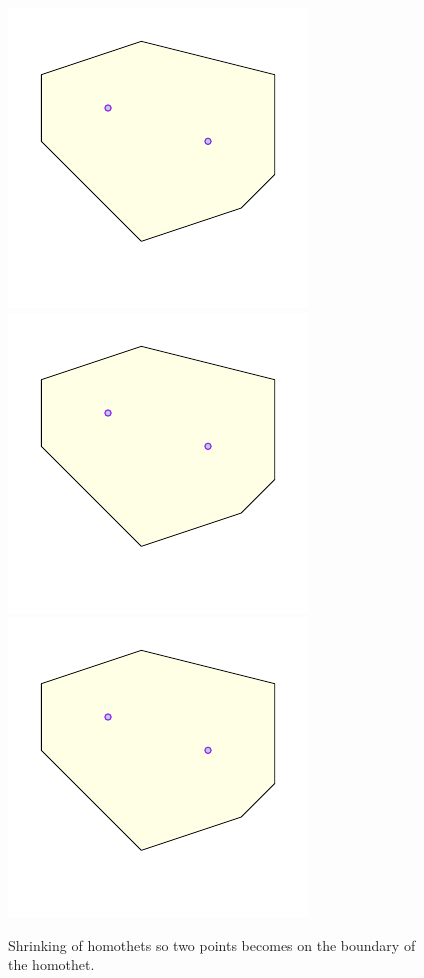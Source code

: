 \begin{figure}[h]
    \includegraphics[page=1]{figs/shrink_2}%
    \hfill%
    \includegraphics[page=2]{figs/shrink_2}%
    \hfill%
    \includegraphics[page=3]{figs/shrink_2}
    \caption{Shrinking of homothets so two points becomes on the
       boundary of the homothet.}
\end{figure}

